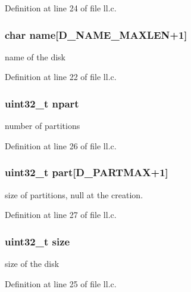 Definition at line 24 of file ll.\+c.

\hypertarget{structdisk__ent_abdbe698c98e706aedc0bb0440029eae3}{}
\subsubsection[{name}]{\setlength{\rightskip}{0pt plus 5cm}char name\mbox{[}{\bf D\+\_\+\+N\+A\+M\+E\+\_\+\+M\+A\+X\+L\+E\+N}+1\mbox{]}}\label{structdisk__ent_abdbe698c98e706aedc0bb0440029eae3}
name of the disk 

Definition at line 22 of file ll.\+c.

\hypertarget{structdisk__ent_ac84778576a3eb0108d6839c8f24f373c}{}
\subsubsection[{npart}]{\setlength{\rightskip}{0pt plus 5cm}uint32\+\_\+t npart}\label{structdisk__ent_ac84778576a3eb0108d6839c8f24f373c}
number of partitions 

Definition at line 26 of file ll.\+c.

\hypertarget{structdisk__ent_ae2e0abcdae058274a0cea31ad73c85a8}{}
\subsubsection[{part}]{\setlength{\rightskip}{0pt plus 5cm}uint32\+\_\+t part\mbox{[}{\bf D\+\_\+\+P\+A\+R\+T\+M\+A\+X}+1\mbox{]}}\label{structdisk__ent_ae2e0abcdae058274a0cea31ad73c85a8}
size of partitions, null at the creation. 

Definition at line 27 of file ll.\+c.

\hypertarget{structdisk__ent_ab2c6b258f02add8fdf4cfc7c371dd772}{}
\subsubsection[{size}]{\setlength{\rightskip}{0pt plus 5cm}uint32\+\_\+t size}\label{structdisk__ent_ab2c6b258f02add8fdf4cfc7c371dd772}
size of the disk 

Definition at line 25 of file ll.\+c.

